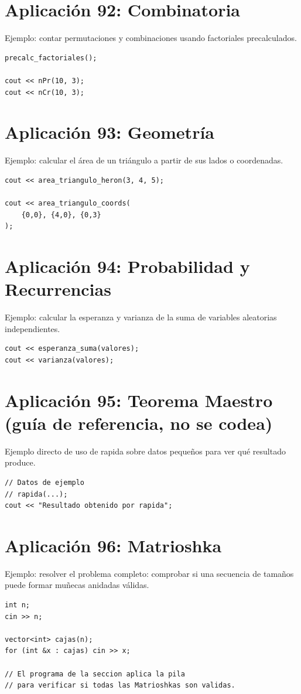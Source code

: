 \documentclass[10pt,twocolumn,letterpaper]{report}
\begin{document}
\section{Aplicación 92: Combinatoria}
Ejemplo: contar permutaciones y combinaciones usando factoriales precalculados.

\begin{lstlisting}
precalc_factoriales();

cout << nPr(10, 3);
cout << nCr(10, 3);
\end{lstlisting}

\section{Aplicación 93: Geometría}
Ejemplo: calcular el área de un triángulo a partir de sus lados o coordenadas.

\begin{lstlisting}
cout << area_triangulo_heron(3, 4, 5);

cout << area_triangulo_coords(
    {0,0}, {4,0}, {0,3}
);
\end{lstlisting}

\section{Aplicación 94: Probabilidad y Recurrencias}
Ejemplo: calcular la esperanza y varianza de la suma de variables aleatorias independientes.

\begin{lstlisting}
cout << esperanza_suma(valores);
cout << varianza(valores);
\end{lstlisting}

\section{Aplicación 95: Teorema Maestro (guía de referencia, no se codea)}
Ejemplo directo de uso de rapida sobre datos pequeños para ver qué resultado produce.

\begin{lstlisting}
// Datos de ejemplo
// rapida(...);
cout << "Resultado obtenido por rapida";
\end{lstlisting}

\section{Aplicación 96: Matrioshka}
Ejemplo: resolver el problema completo: comprobar si una secuencia de tamaños puede formar muñecas anidadas válidas.

\begin{lstlisting}
int n;
cin >> n;

vector<int> cajas(n);
for (int &x : cajas) cin >> x;

// El programa de la seccion aplica la pila
// para verificar si todas las Matrioshkas son validas.
\end{lstlisting}
\end{document}

